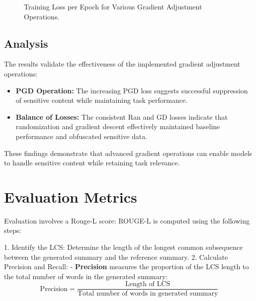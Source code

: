 \documentclass[11pt]{article}
\begin{document}
\begin{figure}[h!]
    \centering
    \caption{Training Loss per Epoch for Various Gradient Adjustment Operations.}
    \label{fig:training-loss}
\end{figure}

\subsection{Analysis}
The results validate the effectiveness of the implemented gradient adjustment operations:
\begin{itemize}
    \item \textbf{PGD Operation:} The increasing PGD loss suggests successful suppression of sensitive content while maintaining task performance.
    \item \textbf{Balance of Losses:} The consistent Ran and GD losses indicate that randomization and gradient descent effectively maintained baseline performance and obfuscated sensitive data.
\end{itemize}
These findings demonstrate that advanced gradient operations can enable models to handle sensitive content while retaining task relevance.

    \section{Evaluation Metrics}
    Evaluation involves a Rouge-L score:
    ROUGE-L is computed using the following steps:

    1. Identify the LCS: Determine the length of the longest common subsequence between the generated summary and the reference summary.
    2. Calculate Precision and Recall:
    - \textbf{Precision} measures the proportion of the LCS length to the total number of words in the generated summary:
    \begin{equation}
        \text{Precision} = \frac{\text{Length of LCS}}{\text{Total number of words in generated summary}}
    \end{equation}
\end{document}
